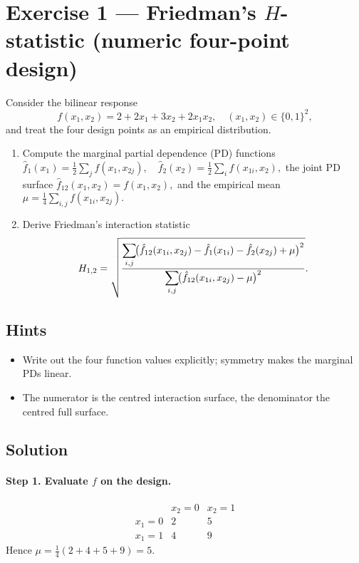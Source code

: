 \documentclass[a4paper]{article}
\begin{document}

\section*{Exercise 1 — Friedman's $H$-statistic (numeric four-point design)}
\label{ex:H_numeric}

Consider the bilinear response
\[
f(x_1,x_2)=2+2x_1+3x_2+2x_1x_2,
\quad
(x_1,x_2)\in\{0,1\}^2,
\]
and treat the four design points as an empirical distribution.

\begin{enumerate}%
  \item Compute the marginal partial dependence (PD) functions
        \(
        \hat f_{1}(x_1)=\tfrac12\!\sum_{j}f(x_1,x_{2j}),
        \quad
        \hat f_{2}(x_2)=\tfrac12\!\sum_{i}f(x_{1i},x_2),
        \)
        the joint PD surface
        \(
        \hat f_{12}(x_1,x_2)=f(x_1,x_2),
        \)
        and the empirical mean
        \(
        \mu=\tfrac14\!\sum_{i,j}f(x_{1i},x_{2j}).
        \)
  \item Derive Friedman's interaction statistic
        \[
          H_{1,2}
          =\sqrt{%
            \frac{\displaystyle
                  \sum_{i,j}\!\bigl(
                    \hat f_{12}(x_{1i},x_{2j})-
                    \hat f_{1}(x_{1i})-
                    \hat f_{2}(x_{2j})+\mu
                  \bigr)^{2}}
                 {\displaystyle
                  \sum_{i,j}\!\bigl(
                    \hat f_{12}(x_{1i},x_{2j})-\mu
                  \bigr)^{2}}}.
        \]
\end{enumerate}

\subsection*{Hints}
\begin{itemize}
  \item Write out the four function values explicitly; symmetry makes the marginal PDs linear.
  \item The numerator is the centred interaction surface, the denominator the centred full surface.
\end{itemize}

\subsection*{Solution}
\paragraph{Step 1.  Evaluate $f$ on the design.}
\[
\begin{array}{c|cc}
          & x_2=0 & x_2=1 \\ \hline
x_1=0 & 2 & 5 \\
x_1=1 & 4 & 9
\end{array}
\]
Hence $\mu=\tfrac14(2+4+5+9)=5$.
\end{document}
